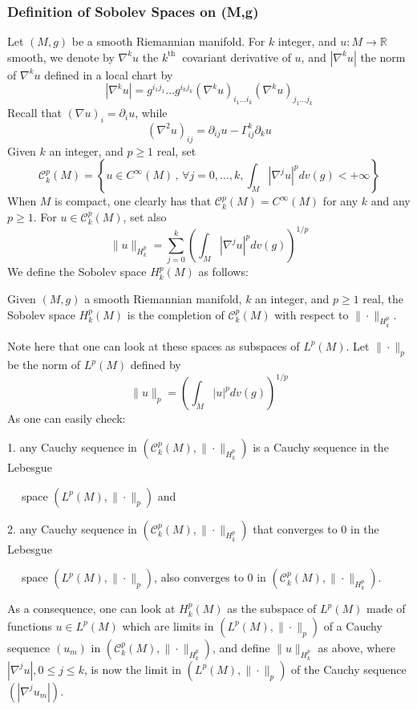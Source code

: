\documentclass[12pt,hyperref,a4paper,UTF8]{ctexart}
\begin{document}
\subsubsection{Definition of Sobolev Spaces on (M,g)}
Let $(M, g)$ be a smooth Riemannian manifold. For $k$ integer, and $u: M \rightarrow \mathbb{R}$ smooth, we denote by $\nabla^k u$ the $k^{\text {th }}$ covariant derivative of $u$, and $\left|\nabla^k u\right|$ the norm of $\nabla^k u$ defined in a local chart by
$$
\left|\nabla^k u\right|=g^{i_1 j_1} \ldots g^{i_k j_k}\left(\nabla^k u\right)_{i_1 \ldots i_k}\left(\nabla^k u\right)_{j_1 \ldots j_k}
$$
Recall that $(\nabla u)_i=\partial_i u$, while
$$
\left(\nabla^2 u\right)_{i j}=\partial_{i j} u-\Gamma_{i j}^k \partial_k u
$$
Given $k$ an integer, and $p \geq 1$ real, set
$$
\mathcal{C}_k^p(M)=\left\{u \in C^{\infty}(M)\,,\, \forall j=0, \ldots, k, \int_M\left|\nabla^j u\right|^p d v(g)<+\infty\right\}
$$
When $M$ is compact, one clearly has that $\mathcal{C}_k^p(M)=C^{\infty}(M)$ for any $k$ and any $p \geq 1$. For $u \in \mathcal{C}_k^p(M)$, set also
$$
\|u\|_{H_k^p}=\sum_{j=0}^k\left(\int_M\left|\nabla^j u\right|^p d v(g)\right)^{1 / p}
$$
We define the Sobolev space $H_k^p(M)$ as follows:

\begin{Definition}
    Given $(M, g)$ a smooth Riemannian manifold, $k$ an integer, and $p \geq 1$ real, the Sobolev space $H_k^p(M)$ is the completion of $\mathcal{C}_k^p(M)$ with respect to $\|\cdot\|_{H_k^p}$.
\label{def31}
\end{Definition}

Note here that one can look at these spaces as subspaces of $L^p(M)$. Let $\|\cdot\|_p$ be the norm of $L^p(M)$ defined by
$$
\|u\|_p=\left(\int_M|u|^p d v(g)\right)^{1 / p}
$$
As one can easily check:

1. any Cauchy sequence in $\left(\mathcal{C}_k^p(M),\|\cdot\|_{H_k^p}\right)$ is a Cauchy sequence in the Lebesgue 

$\quad\;$space $\left(L^p(M),\|\cdot\|_p\right)$ and

2. any Cauchy sequence in $\left(\mathcal{C}_k^p(M),\|\cdot\|_{H_k^p}\right)$ that converges to 0 in the Lebesgue 

$\quad\;$space $\left(L^p(M),\|\cdot\|_p\right)$, also converges to 0 in $\left(\mathcal{C}_k^p(M),\|\cdot\|_{H_k^p}\right)$.

\vskip 3pt
\noindent
As a consequence, one can look at $H_k^p(M)$ as the subspace of $L^p(M)$ made of functions $u \in L^p(M)$ which are limits in $\left(L^p(M),\|\cdot\|_p\right)$ of a Cauchy sequence $\left(u_m\right)$ in $\left(\mathcal{C}_k^p(M),\|\cdot\|_{H_k^p}\right)$, and define $\|u\|_{H_k^p}$ as above, where $\left|\nabla^j u\right|, 0 \leq j \leq k$, is now the limit in $\left(L^p(M),\|\cdot\|_p\right)$ of the Cauchy sequence $\left(\left|\nabla^j u_m\right|\right)$.
\end{document}
